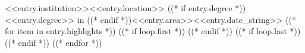 \resumeSubheading
    {<<entry.institution>>}{<<entry.location>>}
    {((* if entry.degree *))<<entry.degree>> in ((* endif *))<<entry.area>>}{<<entry.date_string>>}
((* for item in entry.highlights *))
    ((* if loop.first *))
    \resumeItemListStart
    ((* endif *))
    ((* if loop.last *))
    \resumeItemListEnd
    ((* endif *))
((* endfor *))